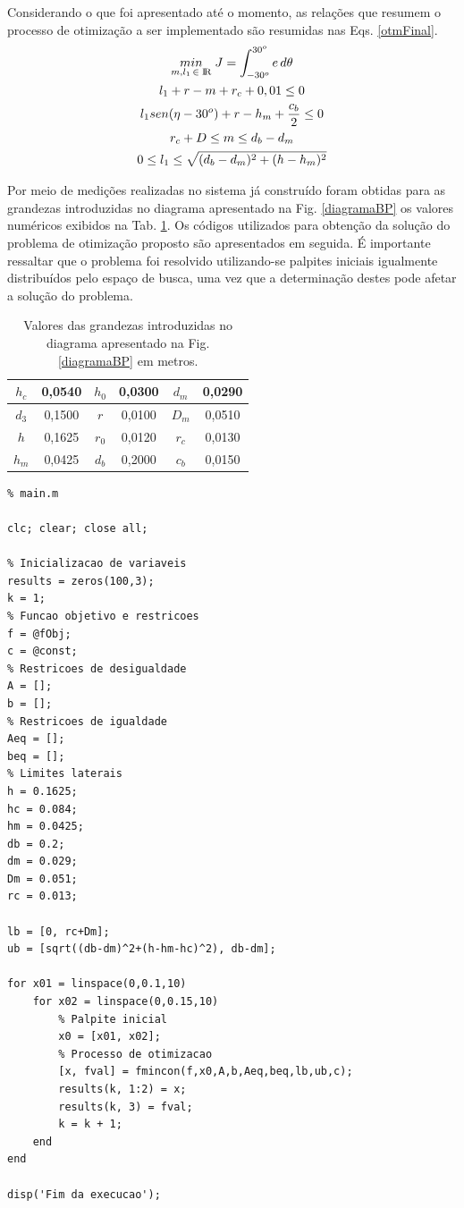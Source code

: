 \documentclass[12pt]{article}
\begin{document}
	Considerando o que foi apresentado até o momento, as relações que resumem o processo de otimização a ser implementado são resumidas nas Eqs. \ref{otmFinal}.
	\begin{equation}
		\label{otmFinal}
		\begin{gathered}
			\underset{m, l_1 \, \in \; {\rm I\!R}}{min} \; J = \int_{-30^o}^{30^o} e \, d\theta \\
			l_1 + r - m + r_c + 0,01 \leq 0 \\
			l_1 sen(\eta - 30^o) + r - h_m + \frac{c_b}{2} \leq 0 \\
			r_c + D \leq m \leq d_b - d_m \\
			0 \leq l_1 \leq \sqrt{(d_b - d_m)^2 + (h - h_m)^2} \\
		\end{gathered}
	\end{equation}
	
	Por meio de medições realizadas no sistema já construído foram obtidas para as grandezas introduzidas no diagrama apresentado na Fig. \ref{diagramaBP} os valores numéricos exibidos na Tab. \ref{tabGrand}. Os códigos utilizados para obtenção da solução do problema de otimização proposto são apresentados em seguida. É importante ressaltar que o problema foi resolvido utilizando-se palpites iniciais igualmente distribuídos pelo espaço de busca, uma vez que a determinação destes pode afetar a solução do problema. 
	
	\begin{table}[H]
		\centering
		\caption{Valores das grandezas introduzidas no diagrama apresentado na Fig. \ref{diagramaBP} em metros.}
		\label{tabGrand}
		\begin{tabular}{|c|c|c|c|c|c|}
			\hline
			$h_c$ & 0,0540 & $h_0$ & 0,0300 & $d_m$ & 0,0290 \\ \hline
			$d_3$ & 0,1500 & $r$   & 0,0100 & $D_m$ & 0,0510 \\ \hline
			$h$   & 0,1625 & $r_0$ & 0,0120 & $r_c$ & 0,0130 \\ \hline
			$h_m$ & 0,0425 & $d_b$ & 0,2000 & $c_b$ & 0,0150 \\ \hline
		\end{tabular}
	\end{table}

\begin{lstlisting}
% main.m
	
clc; clear; close all;

% Inicializacao de variaveis
results = zeros(100,3);
k = 1;
% Funcao objetivo e restricoes
f = @fObj;
c = @const;
% Restricoes de desigualdade
A = [];
b = [];
% Restricoes de igualdade
Aeq = [];
beq = [];
% Limites laterais
h = 0.1625;
hc = 0.084;
hm = 0.0425;
db = 0.2;
dm = 0.029;
Dm = 0.051;
rc = 0.013;

lb = [0, rc+Dm];
ub = [sqrt((db-dm)^2+(h-hm-hc)^2), db-dm];

for x01 = linspace(0,0.1,10)
	for x02 = linspace(0,0.15,10)
		% Palpite inicial
		x0 = [x01, x02];
		% Processo de otimizacao
		[x, fval] = fmincon(f,x0,A,b,Aeq,beq,lb,ub,c);
		results(k, 1:2) = x;
		results(k, 3) = fval;
		k = k + 1;
	end
end

disp('Fim da execucao');
\end{lstlisting}
\end{document}
